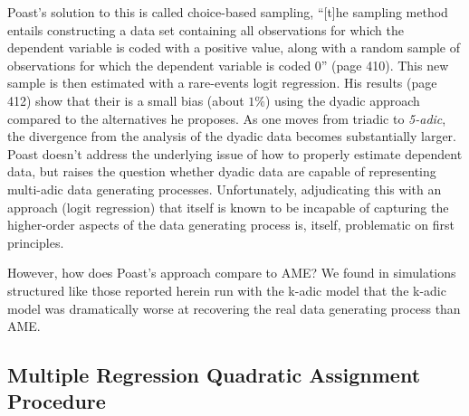 Poast's solution to this is called choice-based sampling, ``[t]he sampling method entails constructing a data set containing all observations for which the dependent variable is coded with a positive value, along with a random sample of observations for which the dependent variable is coded 0'' (page 410). This new sample is then estimated with a rare-events logit regression. His results (page 412) show that their is a small bias (about $1\%$) using the dyadic approach compared to the alternatives he proposes.  As one moves from triadic to \textit{5-adic}, the divergence from the analysis of the dyadic data becomes substantially larger. Poast doesn't address the underlying issue of how to properly estimate dependent data, but raises the question whether dyadic data are capable of representing multi-adic data generating processes.  Unfortunately, adjudicating this with an approach (logit regression) that itself is known to be incapable of capturing the higher-order aspects of the data generating process is, itself, problematic on first principles.  

However, how does Poast's approach compare to AME? We found in simulations structured like those reported herein run with the k-adic model that the k-adic model was dramatically worse at recovering the real data generating process than AME. 


\subsection*{Multiple Regression Quadratic Assignment Procedure}

